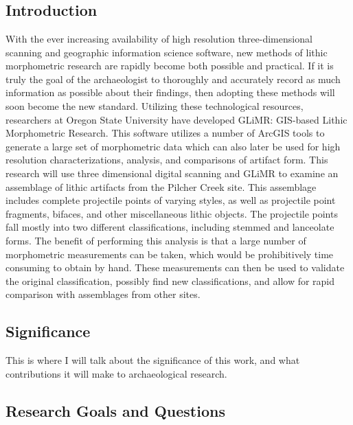 \chapter{}

\section{Introduction}
	With the ever increasing availability of high resolution three-dimensional scanning and geographic information science software, new methods of lithic morphometric research are rapidly become both possible and practical. If it is truly the goal of the archaeologist to thoroughly and accurately record as much information as possible about their findings, then adopting these methods will soon become the new standard. Utilizing these technological resources, researchers at Oregon State University have developed GLiMR: GIS-based Lithic Morphometric Research. This software utilizes a number of ArcGIS tools to generate a large set of morphometric data which can also later be used for high resolution characterizations, analysis, and comparisons of artifact form.
	This research will use three dimensional digital scanning and GLiMR to examine an assemblage of lithic artifacts from the Pilcher Creek site. This assemblage includes complete projectile points of varying styles, as well as projectile point fragments, bifaces, and other miscellaneous lithic objects. The projectile points fall mostly into two different classifications, including stemmed and lanceolate forms. The benefit of performing this analysis is that a large number of morphometric measurements can be taken, which would be prohibitively time consuming to obtain by hand. These measurements can then be used to validate the original classification, possibly find new classifications, and allow for rapid comparison with assemblages from other sites.

\section{Significance}
	This is where I will talk about the significance of this work, and what contributions it will make to archaeological research.

\section{Research Goals and Questions}
